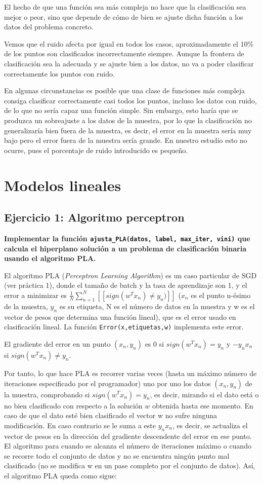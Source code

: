 \documentclass[a4]{article}
\begin{document}
El hecho de que una función sea más compleja no hace que la clasificación sea mejor o peor, sino que depende de cómo de bien se ajuste dicha función a los datos del problema concreto. 

Vemos que el ruido afecta por igual en todos los casos, aproximadamente el 10\% de los puntos son clasificados incorrectamente siempre. Aunque la frontera de clasificación sea la adecuada y se ajuste bien a los datos, no va a poder clasificar correctamente los puntos con ruido. 

En algunas circunstancias es posible que una clase de funciones más compleja consiga clasificar correctamente casi todos los puntos, incluso los datos con ruido, de lo que no sería capaz una función simple. Sin embargo, esto haría que se produzca un sobreajuste a los datos de la muestra, por lo que la clasificación no generalizaría bien fuera de la muestra, es decir, el error en la muestra sería muy bajo pero el error fuera de la muestra sería grande. En nuestro estudio esto no ocurre, pues el porcentaje de ruido introducido es pequeño.

\newpage
\section{Modelos lineales}
\subsection{Ejercicio 1: Algoritmo perceptron}

\textbf{Implementar la función \lstinline|ajusta_PLA(datos, label, max_iter, vini)|
que calcula el hiperplano solución a un problema de clasificación binaria usando el
algoritmo PLA.}

El algoritmo PLA (\textit{Perceptron Learning Algorithm}) es un caso particular de SGD (ver práctica 1), donde el tamaño de batch y la tasa de aprendizaje son 1, y el error a minimizar es $\frac{1}{N}\sum_{n=1}^{N}[[sign(w^Tx_n)\neq y_n)]]$ ($x_n$ es el punto n-ésimo de la muestra, $y_n$ es su etiqueta, N es el número de datos en la muestra y w es el vector de pesos que determina una función lineal), que es el error usado en clasificación lineal. La función \lstinline|Error(x,etiquetas,w)| implementa este error.

El gradiente del error en un punto $(x_n,y_n)$ es 0 si $sign(w^Tx_n)=y_n $ y $-y_nx_n$ si $sign(w^Tx_n)\neq y_n $. 

Por tanto, lo que hace PLA es recorrer varias veces (hasta un máximo número de iteraciones especificado por el programador) uno por uno los datos $(x_n,y_n)$ de la muestra, comprobando si $sign(w^Tx_n)=y_n $, es decir, mirando si el dato está o no bien clasificado con respecto a la solución $ w $ obtenida hasta ese momento. En caso de que el dato esté bien clasificado el vector w no sufre ninguna modificación. En caso contrario se le suma a este $y_nx_n$, es decir, se actualiza el vector de pesos en la dirección del gradiente descendente del error en ese punto. El algoritmo para cuando se alcanza el número de iteraciones máximo o cuando se recorre todo el conjunto de datos y no se encuentra ningún punto mal clasificado (no se modifica w en un pase completo por el conjunto de datos). Así, el algoritmo PLA queda como sigue:
\end{document}
